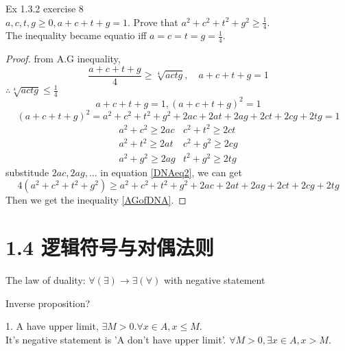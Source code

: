 	
\begin{example}{Ex 1.3.2}
 	exercise 8\\
 	$ a,c,t,g \ge 0, a+c+t+g =1 $. Prove that $ a^2+c^2+t^2+g^2 \ge \frac{1}{4} $.\\ The inequality became equatio iff $ a=c=t=g=\frac{1}{4} $.\\
 	\end{example}
 
\begin{proof}
 	from A.G inequality,
 	\begin{equation}\label{AGofDNA}
 		\frac{a+c+t+g}{4} \ge \sqrt[4]{actg}, \quad a+c+t+g=1
 	\end{equation}
 	$ \therefore \sqrt[4]{actg} \leqslant \frac{1}{4} $
 	\begin{equation*}
 		a+c+t+g=1, (a+c+t+g)^2=1
 	\end{equation*}
 	\begin{equation}\label{DNAeq2}
 		(a+c+t+g)^2=a^2+c^2+t^2+g^2+2ac+2at+2ag+2ct+2cg+2tg = 1
 	\end{equation}
 	\begin{align}
 		a^2+c^2 \ge 2ac &c^2+t^2 \ge 2ct \\
 		a^2+t^2 \ge 2at &c^2+g^2 \ge 2cg \\
 		a^2+g^2 \ge 2ag &t^2+g^2 \ge 2tg
 	\end{align}
 	substitude $ 2ac,2ag,\dots $ in equation \ref{DNAeq2}, we can get
 	\begin{equation*}
 		4(a^2+c^2+t^2+g^2)\ge a^2+c^2+t^2+g^2+2ac+2at+2ag+2ct+2cg+2tg
 	\end{equation*}
 	Then we get the inequality \ref{AGofDNA}.
\end{proof}

 	\section{1.4 逻辑符号与对偶法则}
 	The law of duality: 
 	$ \forall(\exists) \rightarrow \exists(\forall) $
 	with negative statement
 	
 	Inverse proposition? 
 	
 	1. A have upper limit, $ \exists M>0. \forall x\in A, x\leqslant M $.\\
 	It's negative statement is 'A don't have upper limit'. $ \forall M >0, \exists x\in A, x>M $.
 	
